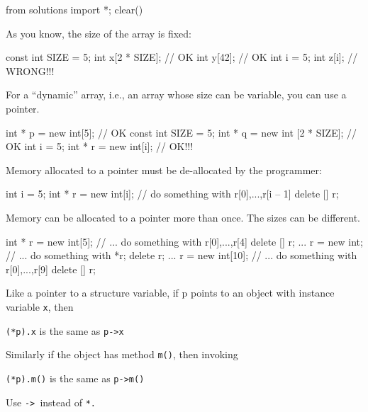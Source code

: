 \begin{python0}
from solutions import *; clear()
\end{python0}

As you know, the size of the array is fixed:
\begin{console}
const int SIZE = 5;
int x[2 * SIZE];        // OK
int y[42];              // OK
int i = 5;
int z[i];               // WRONG!!!
\end{console}
For a ``dynamic'' array, i.e., an array whose size can be variable, you
can use a pointer.
\begin{console}
int * p = new int[5];         // OK
const int SIZE = 5;
int * q = new int [2 * SIZE]; // OK
int i = 5;
int * r = new int[i]; // OK!!!
\end{console}
Memory allocated to a pointer must be de-allocated by the programmer:

\begin{console}
int i = 5;
int * r = new int[i];
// do something with r[0],...,r[i -- 1]
delete [] r;
\end{console}
Memory can be allocated to a pointer more than once. The sizes can be
different.

\begin{console}
int * r = new int[5];
// ... do something with r[0],...,r[4]
delete [] r;
...
r = new int;
// ... do something with *r;
delete r;
...
r = new int[10];
// ... do something with r[0],...,r[9]
delete [] r;
\end{console}
Like a pointer to a structure variable, if p points to an object with
instance variable \texttt{x}, then
\begin{center}
\verb!(*p).x! is the same as \verb!p->x!
\end{center}
Similarly if the object has method \texttt{m()}, then invoking
\begin{center}
\texttt{(*p).m()} is the same as \texttt{p->m()}
\end{center}
Use \texttt{-> }instead of \texttt{*.}

